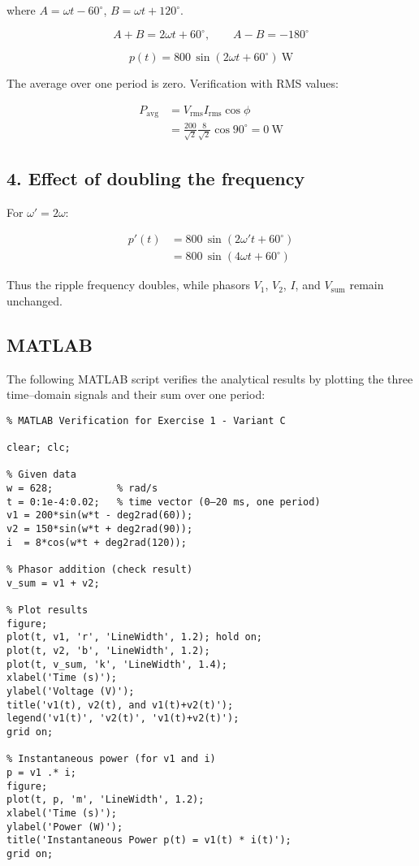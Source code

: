 \documentclass{article}
\begin{document}
where \(A=\omega t-60^\circ\), \(B=\omega t+120^\circ\).

\[
A+B=2\omega t+60^\circ,\qquad A-B=-180^\circ
\]

\[
\boxed{p(t)=800\,\sin(2\omega t+60^\circ)\ \text{W}}
\]

The average over one period is zero.  
Verification with RMS values:

\[
\begin{aligned}
P_{\text{avg}}
 &= V_{\text{rms}}I_{\text{rms}}\cos\phi\\
 &= \frac{200}{\sqrt2}\frac{8}{\sqrt2}\cos90^\circ = 0\ \text{W}
\end{aligned}
\]

\subsection*{4. Effect of doubling the frequency}

For \(\omega' = 2\omega\):

\[
\begin{aligned}
p'(t)
 &= 800\,\sin(2\omega' t + 60^\circ)\\
 &= 800\,\sin(4\omega t + 60^\circ)
\end{aligned}
\]

Thus the ripple frequency doubles, while phasors \(V_1\), \(V_2\), \(I\), and \(V_{\text{sum}}\) remain unchanged.


\subsection*{MATLAB}

The following MATLAB script verifies the analytical results by plotting
the three time–domain signals and their sum over one period:

\begin{verbatim}
% MATLAB Verification for Exercise 1 - Variant C

clear; clc;

% Given data
w = 628;           % rad/s
t = 0:1e-4:0.02;   % time vector (0–20 ms, one period)
v1 = 200*sin(w*t - deg2rad(60));
v2 = 150*sin(w*t + deg2rad(90));
i  = 8*cos(w*t + deg2rad(120));

% Phasor addition (check result)
v_sum = v1 + v2;

% Plot results
figure;
plot(t, v1, 'r', 'LineWidth', 1.2); hold on;
plot(t, v2, 'b', 'LineWidth', 1.2);
plot(t, v_sum, 'k', 'LineWidth', 1.4);
xlabel('Time (s)');
ylabel('Voltage (V)');
title('v1(t), v2(t), and v1(t)+v2(t)');
legend('v1(t)', 'v2(t)', 'v1(t)+v2(t)');
grid on;

% Instantaneous power (for v1 and i)
p = v1 .* i;
figure;
plot(t, p, 'm', 'LineWidth', 1.2);
xlabel('Time (s)');
ylabel('Power (W)');
title('Instantaneous Power p(t) = v1(t) * i(t)');
grid on;
\end{verbatim}
\end{document}
